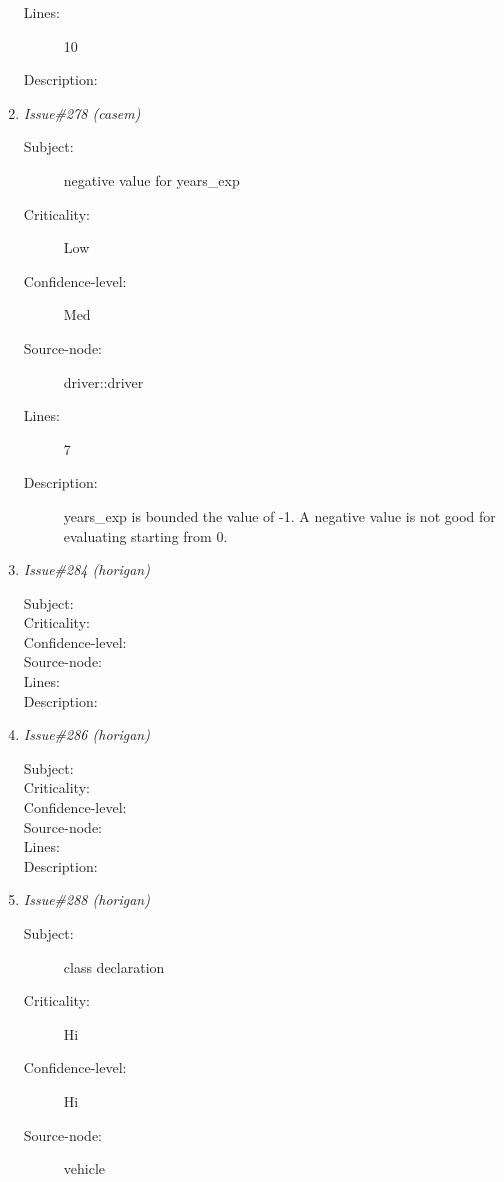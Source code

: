 \begin{enumerate}
\begin{description}
\item [Lines:] 10

\item [Description:] 
\end{description}
\item {\it Issue\#278 (casem)}
\begin{description}
\item [Subject:] negative value for years\_exp
\item [Criticality:] Low
\item [Confidence-level:] Med
\item [Source-node:] driver::driver

\item [Lines:] 7

\item [Description:] years\_exp is bounded the value of -1.
A negative value is not good for evaluating starting from 0.
\end{description}
\item {\it Issue\#284 (horigan)}
\begin{description}
\item [Subject:] 
\item [Criticality:] 
\item [Confidence-level:] 
\item [Source-node:] 

\item [Lines:] 

\item [Description:] 
\end{description}
\item {\it Issue\#286 (horigan)}
\begin{description}
\item [Subject:] 
\item [Criticality:] 
\item [Confidence-level:] 
\item [Source-node:] 

\item [Lines:] 

\item [Description:] 
\end{description}
\item {\it Issue\#288 (horigan)}
\begin{description}
\item [Subject:] class declaration
\item [Criticality:] Hi
\item [Confidence-level:] Hi
\item [Source-node:] vehicle


\end{description}
\end{enumerate}

